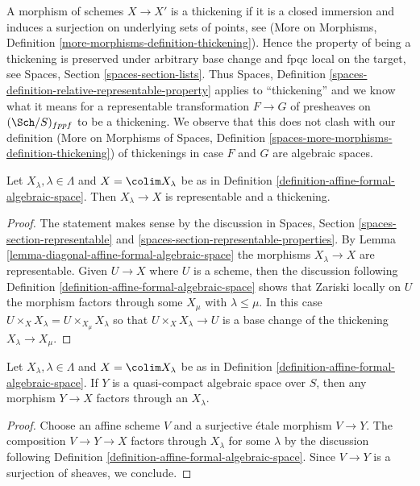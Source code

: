 \noindent
A morphism of schemes $X \to X'$ is a thickening if it is a closed immersion
and induces a surjection on underlying sets of points, see
(More on Morphisms, Definition
\ref{more-morphisms-definition-thickening}).
Hence the property of being a thickening is preserved under arbitrary
base change and fpqc local on the target, see
Spaces, Section \ref{spaces-section-lists}.
Thus Spaces, Definition \ref{spaces-definition-relative-representable-property}
applies to ``thickening'' and we know what it means for a
representable transformation $F \to G$ of
presheaves on $(\Sch/S)_{fppf}$ to be a thickening.
We observe that this does not clash with our definition
(More on Morphisms of Spaces, Definition
\ref{spaces-more-morphisms-definition-thickening})
of thickenings in case $F$ and $G$ are algebraic spaces.

\begin{lemma}
\label{lemma-covering-by-thickenings}
Let $X_\lambda, \lambda \in \Lambda$ and $X = \colim X_\lambda$
be as in Definition \ref{definition-affine-formal-algebraic-space}.
Then $X_\lambda \to X$ is representable and a thickening.
\end{lemma}

\begin{proof}
The statement makes sense by the discussion in
Spaces, Section \ref{spaces-section-representable} and
\ref{spaces-section-representable-properties}.
By Lemma \ref{lemma-diagonal-affine-formal-algebraic-space}
the morphisms $X_\lambda \to X$ are representable.
Given $U \to X$ where $U$ is a scheme,
then the discussion following
Definition \ref{definition-affine-formal-algebraic-space}
shows that Zariski locally on $U$ the
morphism factors through some $X_\mu$ with $\lambda \leq \mu$.
In this case $U \times_X X_\lambda = U \times_{X_\mu} X_\lambda$
so that $U \times_X X_\lambda \to U$ is a base change of
the thickening $X_\lambda \to X_\mu$.
\end{proof}

\begin{lemma}
\label{lemma-factor-through-thickening}
Let $X_\lambda, \lambda \in \Lambda$ and $X = \colim X_\lambda$
be as in Definition \ref{definition-affine-formal-algebraic-space}.
If $Y$ is a quasi-compact algebraic space over $S$, then any
morphism $Y \to X$ factors through an $X_\lambda$.
\end{lemma}

\begin{proof}
Choose an affine scheme $V$ and a surjective \'etale morphism
$V \to Y$. The composition $V \to Y \to X$ factors through
$X_\lambda$ for some $\lambda$ by the discussion following
Definition \ref{definition-affine-formal-algebraic-space}.
Since $V \to Y$ is a surjection of sheaves, we conclude.
\end{proof}

